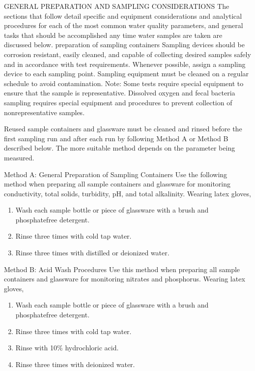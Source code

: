 \documentclass{article}
\begin{document}
GENERAL PREPARATION AND SAMPLING CONSIDERATIONS The sections that follow
detail specific and equipment considerations and analytical procedures
for each of the most common water quality parameters, and general tasks
that should be accomplished any time water samples are taken are
discussed below. preparation of sampling containers Sampling devices
should be corrosion resistant, easily cleaned, and capable of collecting
desired samples safely and in accordance with test requirements.
Whenever possible, assign a sampling device to each sampling point.
Sampling equipment must be cleaned on a regular schedule to avoid
contamination. Note: Some tests require special equipment to ensure that
the sample is representative. Dissolved oxygen and fecal bacteria
sampling requires special equipment and procedures to prevent collection
of nonrepresentative samples.

Reused sample containers and glassware must be cleaned and rinsed before
the first sampling run and after each run by following Method A or
Method B described below. The more suitable method depends on the
parameter being measured.

Method A: General Preparation of Sampling Containers Use the following
method when preparing all sample containers and glassware for monitoring
conductivity, total solids, turbidity, pH, and total alkalinity. Wearing
latex gloves,

\begin{enumerate}
\def\labelenumi{\arabic{enumi}.}
\tightlist
\item
  Wash each sample bottle or piece of glassware with a brush and
  phosphatefree detergent.
\item
  Rinse three times with cold tap water.
\item
  Rinse three times with distilled or deionized water.
\end{enumerate}

Method B: Acid Wash Procedures Use this method when preparing all sample
containers and glassware for monitoring nitrates and phosphorus. Wearing
latex gloves,

\begin{enumerate}
\def\labelenumi{\arabic{enumi}.}
\tightlist
\item
  Wash each sample bottle or piece of glassware with a brush and
  phosphatefree detergent.
\item
  Rinse three times with cold tap water.
\item
  Rinse with 10\% hydrochloric acid.
\item
  Rinse three times with deionized water.
\end{enumerate}
\end{document}

